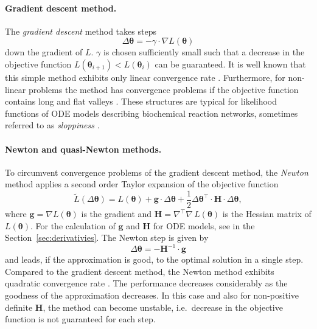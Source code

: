 \documentclass[12pt,a4paper]{scrartcl}
\begin{document}
\paragraph{Gradient descent method.}
The \emph{gradient descent} method takes steps 
\begin{equation}
	\Delta \boldsymbol{\theta} = - \gamma \cdot \nabla L(\boldsymbol{\theta}) 
\label{gradientstep}
\end{equation}	
down the gradient of $L$. $\gamma$ is chosen sufficiently small such that a decrease in 
the objective function $L(\boldsymbol{\theta}_{i+1}) < L(\boldsymbol{\theta}_{i})$ can be 
guaranteed. It is well known that this simple method exhibits only linear convergence rate 
\citep{Stoer:2005fk}. Furthermore, for non-linear problems the method has convergence 
problems if the objective function contains long and flat valleys \citep{Rosenbrock:1960fk}. 
These structures are typical for likelihood functions of ODE models describing biochemical 
reaction networks, sometimes referred to as \emph{sloppiness} \citep{Gutenkunst:2007ct}. 

\paragraph{Newton and quasi-Newton methods.}
To circumvent convergence problems of the gradient descent method, the \emph{Newton} 
method applies a second order Taylor expansion of the objective function
\begin{equation}
	\tilde L(\Delta \boldsymbol{\theta}) = L(\boldsymbol{\theta}) + \mathbf{g} \cdot \Delta 
\boldsymbol{\theta} + \frac{1}{2} \Delta \boldsymbol{\theta}^\top \cdot \mathbf{H} \cdot 
\Delta \boldsymbol{\theta}, \label{2taylor}
\end{equation}
where $\mathbf{g} = \nabla L(\boldsymbol{\theta})$ is the gradient and $\mathbf{H} = 
\nabla^\top\nabla\, L(\boldsymbol{\theta})$ is the Hessian matrix of $L(\boldsymbol{\theta})
$. For the calculation of $\mathbf{g}$ and $\mathbf{H}$ for ODE models, see in the 
Section~\ref{sec:derivativies}. The Newton step is given by 
\begin{equation}
	\Delta \boldsymbol{\theta} = -\mathbf{H}^{-1} \cdot \mathbf{g} \label{newtonstep}
\end{equation}
and leads, if the approximation is good, to the optimal solution in a single step. 
Compared to the gradient descent method, the Newton method exhibits quadratic 
convergence rate \citep{Stoer:2005fk}. The performance decreases considerably as the 
goodness of the approximation decreases. In this case and also for non-positive definite $
\mathbf{H}$, the method can become unstable, i.e.~decrease in the objective function is 
not guaranteed for each step. 
\end{document}
